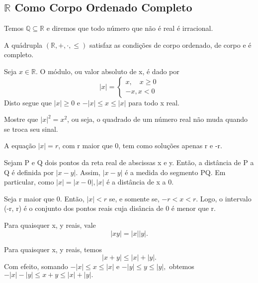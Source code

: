 \documentclass[Analysis/analysis_notes.tex]{subfiles}
\begin{document}
\subsection{$\mathbb{R}$ Como Corpo Ordenado Completo}
Temos $\mathbb{Q}\subseteq{\mathbb{R}}$ e diremos que todo n\'umero que n\~ao \'e real \'e irracional.
\begin{theorem*}
	A qu\'adrupla $(\mathbb{R}, +, \cdot, \leq)$ satisfaz as condi\c c\~oes de corpo ordenado, de corpo e \'e completo.
\end{theorem*}
\begin{def*}
	Seja $x\in \mathbb{R}.$ O m\'odulo, ou valor absoluto de x, \'e dado por
	$$
		|x| = \left\{\begin{array}{ll}
			x, \quad x \geq 0 \\
			-x, x < 0
		\end{array}\right.
	$$
	Disto segue que $|x|\geq 0$ e $-|x|\leq x\leq |x|$ para todo x real.
\end{def*}
\begin{example}
	Mostre que $|x|^2 = x^2$, ou seja, o quadrado de um n\'umero real n\~ao muda quando se troca seu sinal.
\end{example}
\begin{example}
	A equa\c c\~ao $|x| = r$, com r maior que 0, tem como solu\c c\~oes apenas r e -r.
\end{example}
Sejam P e Q dois pontos da reta real de abscissas x e y. Ent\~ao, a dist\^ancia de P a Q \'e definida por $|x-y|$. Assim,
$|x-y|$ \'e a medida do segmento PQ. Em particular, como $|x|=|x-0|, |x|$ \'e a dist\^ancia de x a 0.
\begin{example}
	Seja r maior que 0. Ent\~ao, $|x| < r$ se, e somente se, $-r < x < r.$ Logo, o intervalo (-r, r) \'e o conjunto dos pontos reais
	cuja dis\^ancia de 0 \'e menor que r.
\end{example}
\begin{example}
	Para quaisquer x, y reais, vale
	$$
		|xy| = |x||y|.
	$$
\end{example}
\begin{example}
	Para quaisquer x, y reais, temos
	$$
		|x+y| \leq |x| + |y|.
	$$
	Com efeito, somando $-|x|\leq{x}\leq{|x|}$ e $-|y|\leq{y}\leq{|y|},$ obtemos $-|x|-|y|\leq{x + y}\leq{|x|+|y|.}$\qedsymbol
\end{example}
\end{document}
